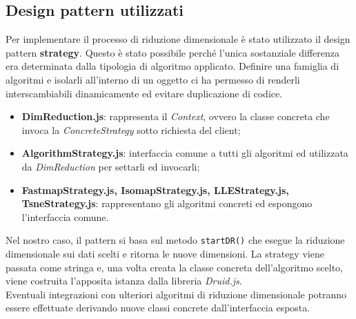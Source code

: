 \subsection{Design pattern utilizzati}
Per implementare il processo di riduzione dimensionale è stato utilizzato il design pattern \textbf{strategy}. Questo è stato possibile perché l'unica sostanziale differenza era determinata dalla tipologia di algoritmo applicato. Definire una famiglia di algoritmi e isolarli all'interno di un oggetto ci ha permesso di renderli interscambiabili dinamicamente ed evitare duplicazione di codice. 
\begin{itemize}
\item \textbf{DimReduction.js}: rappresenta il \textit{Context}, ovvero la classe concreta che invoca la \textit{ConcreteStrategy} sotto richiesta del client;
\item \textbf{AlgorithmStrategy.js}: interfaccia comune a tutti gli algoritmi ed utilizzata da \textit{DimReduction} per settarli ed invocarli;
\item \textbf{FastmapStrategy.js, IsomapStrategy.js, LLEStrategy.js, TsneStrategy.js}: rappresentano gli algoritmi concreti ed espongono l'interfaccia comune.
\end{itemize}

Nel nostro caso, il pattern si basa sul metodo \texttt{startDR()} che esegue la riduzione dimensionale sui dati scelti e ritorna le nuove dimensioni. La strategy viene passata come stringa e, una volta creata la classe concreta dell'algoritmo scelto, viene costruita l'apposita istanza dalla libreria \textit{Druid.js}.\\Eventuali integrazioni con ulteriori algoritmi di riduzione dimensionale potranno essere effettuate derivando nuove classi concrete dall'interfaccia esposta.